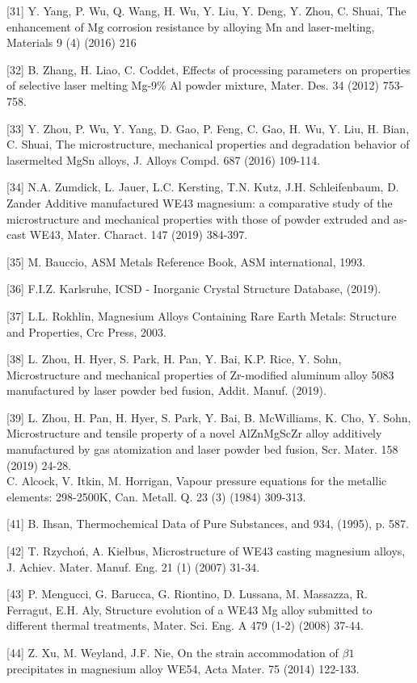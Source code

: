 \documentclass[10pt]{article}
\begin{document}
[31] Y. Yang, P. Wu, Q. Wang, H. Wu, Y. Liu, Y. Deng, Y. Zhou, C. Shuai, The enhancement of $\mathrm{Mg}$ corrosion resistance by alloying Mn and laser-melting, Materials 9 (4) (2016) 216

[32] B. Zhang, H. Liao, C. Coddet, Effects of processing parameters on properties of selective laser melting Mg-9\% Al powder mixture, Mater. Des. 34 (2012) 753-758.

[33] Y. Zhou, P. Wu, Y. Yang, D. Gao, P. Feng, C. Gao, H. Wu, Y. Liu, H. Bian, C. Shuai, The microstructure, mechanical properties and degradation behavior of lasermelted MgSn alloys, J. Alloys Compd. 687 (2016) 109-114.

[34] N.A. Zumdick, L. Jauer, L.C. Kersting, T.N. Kutz, J.H. Schleifenbaum, D. Zander Additive manufactured WE43 magnesium: a comparative study of the microstructure and mechanical properties with those of powder extruded and as-cast WE43, Mater. Charact. 147 (2019) 384-397.

[35] M. Bauccio, ASM Metals Reference Book, ASM international, 1993.

[36] F.I.Z. Karlsruhe, ICSD - Inorganic Crystal Structure Database, (2019).

[37] L.L. Rokhlin, Magnesium Alloys Containing Rare Earth Metals: Structure and Properties, Crc Press, 2003.

[38] L. Zhou, H. Hyer, S. Park, H. Pan, Y. Bai, K.P. Rice, Y. Sohn, Microstructure and mechanical properties of Zr-modified aluminum alloy 5083 manufactured by laser powder bed fusion, Addit. Manuf. (2019).

[39] L. Zhou, H. Pan, H. Hyer, S. Park, Y. Bai, B. McWilliams, K. Cho, Y. Sohn, Microstructure and tensile property of a novel AlZnMgScZr alloy additively manufactured by gas atomization and laser powder bed fusion, Scr. Mater. 158 (2019) 24-28.\\
[40] C. Alcock, V. Itkin, M. Horrigan, Vapour pressure equations for the metallic elements: 298-2500K, Can. Metall. Q. 23 (3) (1984) 309-313.

[41] B. Ihsan, Thermochemical Data of Pure Substances, and 934, (1995), p. 587.

[42] T. Rzychoń, A. Kiełbus, Microstructure of WE43 casting magnesium alloys, J. Achiev. Mater. Manuf. Eng. 21 (1) (2007) 31-34.

[43] P. Mengucci, G. Barucca, G. Riontino, D. Lussana, M. Massazza, R. Ferragut, E.H. Aly, Structure evolution of a WE43 Mg alloy submitted to different thermal treatments, Mater. Sci. Eng. A 479 (1-2) (2008) 37-44.

[44] Z. Xu, M. Weyland, J.F. Nie, On the strain accommodation of $\beta 1$ precipitates in magnesium alloy WE54, Acta Mater. 75 (2014) 122-133.
\end{document}
